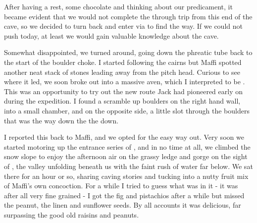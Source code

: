 After having a rest, some chocolate and thinking about our predicament, it became evident that we would not complete the through trip from this end of the cave, so we decided to turn back and enter via  to find the way. If we could not push today, at least we would gain valuable knowledge about the cave. 

Somewhat disappointed, we turned around, going down the phreatic tube back to the start of the boulder choke. I started following the cairns but Maffi spotted another neat stack of stones leading away from the pitch head. Curious to see where it led, we soon broke out into a massive aven, which I interpreted to be . This was an opportunity to try out the new route Jack had pioneered early on during the expedition. I found a scramble up boulders on the right hand wall, into a small chamber, and on the opposite side, a little slot through the boulders that was the way down the the  down. 

I reported this back to Maffi, and we opted for the easy way out. Very soon we started motoring up the entrance series of , and in no time at all, we climbed the snow slope to enjoy the afternoon air on the grassy ledge and gorge on the sight of , the  valley unfolding beneath us with the faint rush of water far below. We sat there for an hour or so, sharing caving stories and tucking into a nutty fruit mix of Maffi's own concoction. For a while I tried to guess what was in it - it was after all very fine grained - I got the fig and pistachios after a while but missed the peanut, the linen and sunflower seeds. By all accounts it was delicious, far surpassing the good old raisins and peanuts. 

